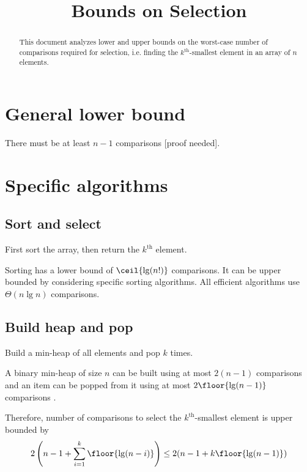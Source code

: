 

\title{Bounds on Selection}



\maketitle

\begin{abstract}
This document analyzes lower and upper bounds on the worst-case number of comparisons required for selection,
i.e. finding the $k^{\textrm{th}}$-smallest element in an array of $n$ elements.
\end{abstract}

\initFromContents{}

\section{General lower bound}

There must be at least $n-1$ comparisons [proof needed].

\section{Specific algorithms}

\subsection{Sort and select}

First sort the array, then return the $k^{\textrm{th}}$ element.

Sorting has a lower bound of $\ceil{\lg(n!)}$ comparisons.
It can be upper bounded by considering specific sorting algorithms.
All efficient algorithms use $\Theta(n\lg n)$ comparisons.

\subsection{Build heap and pop}

Build a min-heap of all elements and pop $k$ times.

A binary min-heap of size $n$ can be built using at most $2(n-1)$ comparisons and an item can be
popped from it using at most $2\floor{\lg (n-1)}$ comparisons \cite{eku-notes-heaps}.

Therefore, number of comparisons to select the $k^{\textrm{th}}$-smallest element is upper bounded by
\[ 2\left( n-1 + \sum_{i=1}^k \floor{\lg(n-i)} \right)
\le 2(n-1 + k\floor{\lg(n-1)}) \]

